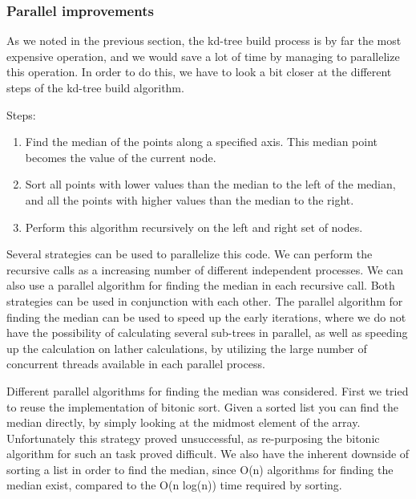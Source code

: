 \begin{enumerate}
\begin{enumerate}
\subsubsection{Parallel improvements} %
\label{ssub:parallel_improvements}

As we noted in the previous section, the kd-tree build process is by far the most expensive operation, and we would save a lot of time by managing to parallelize this operation. In order to do this, we have to look a bit closer at the different steps of the kd-tree build algorithm.

Steps:
\begin{enumerate}
    \item Find the median of the points along a specified axis. This median point becomes the value of the current node.
    \item Sort all points with lower values than the median to the left of the median, and all the points with higher values than the median to the right.
    \item Perform this algorithm recursively on the left and right set of nodes.
\end{enumerate}

Several strategies can be used to parallelize this code. We can perform the recursive calls as a increasing number of different independent processes. We can also use a parallel algorithm for finding the median in each recursive call. Both strategies can be used in conjunction with each other. The parallel algorithm for finding the median can be used to speed up the early iterations, where we do not have the possibility of calculating several sub-trees in parallel, as well as speeding up the calculation on lather calculations, by utilizing the large number of concurrent threads available in each parallel process.

Different parallel algorithms for finding the median was considered. First we tried to reuse the implementation of bitonic sort. Given a sorted list you can find the median directly, by simply looking at the midmost element of the array. Unfortunately this strategy proved unsuccessful, as re-purposing the bitonic algorithm for such an task proved difficult. We also have the inherent downside of sorting a list in order to find the median, since O(n) algorithms for finding the median exist, compared to the O(n log(n)) time required by sorting.


\end{enumerate}
\end{enumerate}
